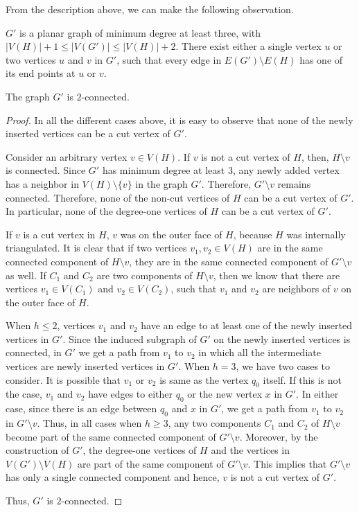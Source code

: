From the description above, we can make the following observation.
\begin{property}\label{supgraph}
 $G'$ is a planar graph of minimum degree at least three, with $|V(H)|+1 \le |V(G')|\le |V(H)|+2$. There exist either a single vertex $u$ or two 
vertices $u$ and $v$ in $G'$, such that every edge in $E(G')\setminus E(H)$ has one of its end points at $u$ or $v$.  
\end{property}
\begin{claim}\label{claim2connect}
The graph $G'$ is $2$-connected.  
\end{claim}
\begin{proof}
In all the different cases above, it is easy to observe that none of the newly inserted vertices can be a cut vertex of $G'$.

Consider an arbitrary vertex $v \in V(H)$. If $v$ is not a cut vertex of $H$, then, $H \setminus v$ is connected. Since $G'$ has minimum degree at 
least $3$, 
any newly added vertex has a neighbor in $V(H)\setminus \{v\}$ in the graph $G'$. Therefore, $G' \setminus v$ remains connected. 
Therefore, none of the non-cut vertices of $H$ can be a cut vertex of $G'$. In particular, none of the degree-one vertices of $H$ can be a cut vertex 
of $G'$.  

If $v$ is a cut vertex in $H$, $v$ was on the outer face of $H$, because $H$ was internally triangulated. It is clear that if two vertices 
$v_1, v_2 \in V(H)$ are in the same connected component of $H \setminus v$, they are in the same connected component of $G' \setminus v$ as well. 
If $C_1$ and $C_2$ are two components of $H \setminus v$, then we know that there are vertices $v_1 \in V(C_1)$ and $v_2 \in V(C_2)$, such that $v_1$ 
and $v_2$ are neighbors of $v$ on the outer face of $H$.

When $h\le 2$, vertices $v_1$ and $v_2$ have an edge to at least one of the newly inserted vertices in $G'$. Since the induced subgraph of $G'$ on the 
newly inserted vertices is connected, in $G'$ we get a path from $v_1$ to $v_2$ in which all the intermediate vertices are newly inserted vertices 
in $G'$. When $h=3$, we have two cases to consider. It is possible that $v_1$ or $v_2$ is same as the vertex $q_0$ itself. If this is not the case, 
$v_1$ and $v_2$ have edges to either $q_0$ or the new vertex $x$ in $G'$. In either case, since there is an edge between $q_0$ and $x$ in $G'$, we 
get a path from $v_1$ to $v_2$ in $G' \setminus v$. Thus, in all cases when $h \ge 3$, any two components $C_1$ and $C_2$ of $H \setminus v$ become 
part of the same connected component of $G' \setminus v$. Moreover, by the construction of $G'$, the degree-one vertices of $H$ and the vertices 
in $V(G')\setminus V(H)$ are part of the same component of $G' \setminus v$. This implies that $G' \setminus v$ has only a single connected component 
and hence, $v$ is not a cut vertex of $G'$. 

Thus, $G'$ is $2$-connected.
\end{proof}
